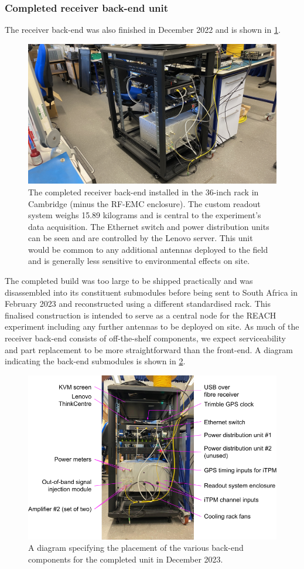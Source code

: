 \subsubsection{Completed receiver back-end unit}
The receiver back-end was also finished in December 2022 and is shown in \cref{fig:backend_complete}.
\begin{figure}
    \centering
    \includegraphics[width=.7\textwidth]{backend_complete}
    \caption{The completed receiver back-end installed in the 36-inch rack in Cambridge (minus the RF-EMC enclosure). The custom readout system weighs 15.89 kilograms and is central to the experiment's data acquisition. The Ethernet switch and power distribution units can be seen and are controlled by the Lenovo server. This unit would be common to any additional antennas deployed to the field and is generally less sensitive to environmental effects on site.}
    \label{fig:backend_complete}
\end{figure}
The completed build was too large to be shipped practically and was disassembled into its constituent submodules before being sent to South Africa in February 2023 and reconstructed using a different standardised rack. This finalised construction is intended to serve as a central node for the REACH experiment including any further antennas to be deployed on site. As much of the receiver back-end consists of off-the-shelf components, we expect serviceability and part replacement to be more straightforward than the front-end. A diagram indicating the back-end submodules is shown in \cref{fig:backend_diag}.
\begin{figure}[t]
    \centering
    \includegraphics[width=\textwidth]{backend_components}
    \caption{A diagram specifying the placement of the various back-end components for the completed unit in December 2023.}
    \label{fig:backend_diag}
\end{figure}


